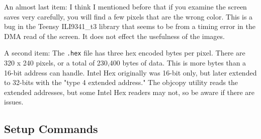 An almost last item: I think I mentioned before that if you examine the screen saves very carefully, you will find a few pixels that are the wrong color. This is a bug in the Teensy ILI9341\_t3 library that seems to be from a timing error in the DMA read of the screen. It does not effect the usefulness of the images.

A second item: The \texttt{.hex} file has three hex encoded bytes per pixel. There are 320 x 240 pixels, or a total of 230,400 bytes of data. This is more bytes than a 16-bit address can handle. Intel Hex originally was 16-bit only, but later extended to 32-bits with the "type 4 extended address." The objcopy utility reads the extended addresses, but some Intel Hex readers may not, so be aware if there are issues.

\subsection{Setup Commands}
